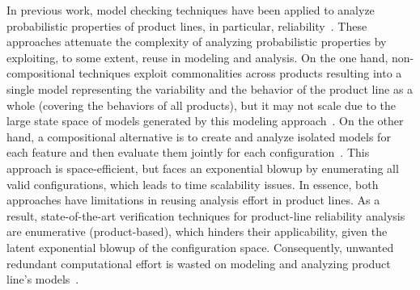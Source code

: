 In previous work, model checking techniques have been applied to analyze
probabilistic properties of product lines, in particular,
reliability~\cite{ghezzi_model-based_2013, rodrigues_modeling_2015,
nunes_variability_2012}. These approaches attenuate the complexity of analyzing
probabilistic properties by exploiting, to some extent, reuse in modeling and
analysis. On the one hand, non-compositional techniques exploit commonalities
across products resulting into a single model representing the variability and
the behavior of the product line as a whole (covering the behaviors of all
products), but it may not scale due to the large state space of models generated
by this modeling approach~\cite{rodrigues_modeling_2015,
nunes_variability_2012}.  On the other hand, a compositional alternative is to
create and analyze isolated models for each feature and then evaluate them
jointly for each configuration~\cite{ghezzi_model-based_2013}. This approach is
space-efficient, but faces an exponential blowup by enumerating all valid
configurations, which leads to time scalability issues. In essence, both
approaches have limitations in reusing analysis effort in product lines. As a
result, state-of-the-art verification techniques for product-line reliability
analysis are enumerative (product-based), which hinders their applicability,
given the latent exponential blowup of the configuration space.  
Consequently, unwanted redundant computational effort is wasted on modeling and
analyzing product line's models~\cite{ghezzi_model-based_2013}.



